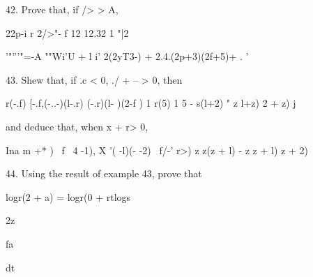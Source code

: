42. Prove that, if /> > A,

22p-i r 2/>"- f 12 12.32 1 "|2

'"'''"=-A ""Wi'U + l i' 2(2yT3-) + 2.4.(2p+3)(2f+5)+ . '


43. Shew that, if .c < 0, ./ + -- > 0, then

r(-.f) [-.f,(-..-)(l-.r) (-.r)(l- )(2-f ) 1 r(5) 1 5 - s(l+2) " z
l+z) 2 + z) j

and deduce that, when x + r> 0,

  Ina m +* ) \ f \ 4   -1), X '( -l)(- -2) \ f/-' r>) z z(z +
l) - z z + l) z + 2)

44. Using the result of example 43, prove that

logr(2 + a) = logr(0 + rtlogs

2z

fa

dt

